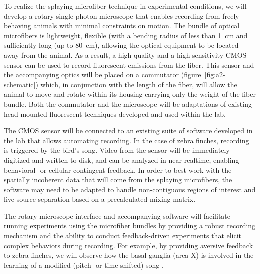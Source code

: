 To realize the splaying microfiber technique in experimental conditions, we will develop
a rotary single-photon microscope that enables recording from freely behaving animals with
minimal constraints on motion. The bundle of optical microfibers is lightweight, flexible 
(with a bending radius of less than 1~\si{\centi\meter} and sufficiently
long (up to 80~\si{\centi\meter}), allowing the optical equipment to
be located away from the animal. As a result, a high-quality and a high-sensitivity 
CMOS sensor can be used to record fluorescent emissions from the fiber. This sensor and the 
accompanying optics will 
be placed on a commutator (figure~\ref{fig:a2-schematic}) which, in conjunction with the length 
of the fiber, will allow
the animal to move and rotate within its housing carrying only the weight of the fiber bundle. 
Both the commutator and the microscope will be adaptations of existing
head-mounted fluorescent techniques developed and used within the lab.

The CMOS sensor will be connected to an existing suite of software developed in the lab that 
allows automating recording. In the case of zebra finches, recording is triggered by the 
bird's song. Video from the sensor will be immediately digitized and written to disk, and 
can be analyzed in near-realtime, enabling behavioral- or cellular-contingent feedback. In 
order to best work with the spatially incoherent data that will come from the splaying microfibers,
the software may need to be adapted to handle non-contiguous regions of interest and live
source separation based on a precalculated mixing matrix.

The rotary microscope interface and accompanying software will facilitate running experiments
using the microfiber bundles by providing a robust recording mechanism and the ability to conduct
feedback-driven experiments that elicit complex behaviors during recording. For example, by
providing aversive feedback to zebra finches, we will observe how the basal ganglia (area X)
is involved in the learning of a modified (pitch- or time-shifted) song \cite{Tumer:2007bi}.
